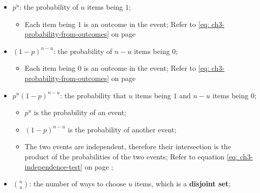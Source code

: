     \begin{itemize}
      \item $ p^{u} $: the probability of $ u $ items being $ 1 $;
      \begin{itemize}
        \item Each item being $ 1 $ is an outcome in the event; Refer to \ref{eq: ch3-probability-from-outcomes} on page \pageref{eq: ch3-probability-from-outcomes}
      \end{itemize}

      \item $ \left( 1 - p \right)^{n - u} $: the probability of $ n - u $ items being $ 0 $;
      \begin{itemize}
        \item Each item being $ 0 $ is an outcome in the event; Refer to \ref{eq: ch3-probability-from-outcomes} on page \pageref{eq: ch3-probability-from-outcomes}
      \end{itemize}
      
      \item $ p^{u} \left( 1 - p \right)^{n - u} $: the probability that $ u $ items being $ 1 $ and $ n - u $ items being $ 0 $;
      \begin{itemize}
        \item $ p^{u} $ is the probability of an event;
        \item $ \left( 1 - p \right)^{n - u} $ is the probability of another event;
        \item The two events are independent, therefore their intersection is the product of the probabilities of the two events; Refer to equation \ref{eq: ch3-independence-test} on page \pageref{eq: ch3-independence-test};
      \end{itemize}
      
      \item $ {n \choose u} $: the number of ways to choose $ u $ items, which is a \textbf{disjoint set};
    \end{itemize}